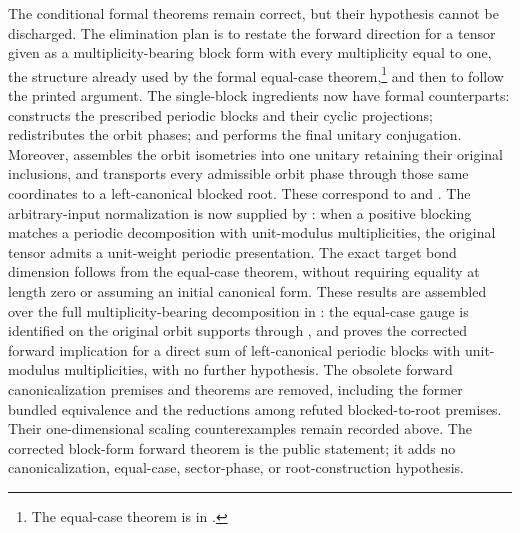 \documentclass{article}
\begin{document}
The conditional formal theorems remain correct, but their hypothesis cannot
be discharged. The elimination plan is to restate the forward direction for a
tensor given as a multiplicity-bearing block form with every multiplicity
equal to one, the structure already used by the formal equal-case
theorem,\footnote{The equal-case theorem is
     in
    .} and then to follow the
printed argument. The single-block ingredients now have formal counterparts:
constructs the prescribed periodic blocks and their cyclic projections;
redistributes the orbit phases; and
performs the final unitary conjugation.
Moreover, 
assembles the orbit isometries into one unitary retaining their original
inclusions, and transports every admissible orbit phase through those same
coordinates to a left-canonical blocked root. These correspond to
 and
.
The arbitrary-input normalization is now supplied by
:
when a positive blocking matches a periodic decomposition with unit-modulus
multiplicities, the original tensor admits a unit-weight periodic presentation.
The exact target bond dimension follows from the equal-case theorem, without
requiring equality at length zero or assuming an initial canonical form.
These results are assembled over the full multiplicity-bearing
decomposition in
: the
equal-case gauge is identified on the original orbit supports through
, and
proves the corrected forward implication for a direct sum of left-canonical
periodic blocks with unit-modulus multiplicities, with no further hypothesis.
The obsolete forward canonicalization premises and theorems are removed,
including the former bundled equivalence and the reductions among refuted
blocked-to-root premises. Their one-dimensional scaling counterexamples
remain recorded above. The corrected block-form forward theorem is the
public statement; it adds no canonicalization, equal-case, sector-phase,
or root-construction hypothesis.
\end{document}

